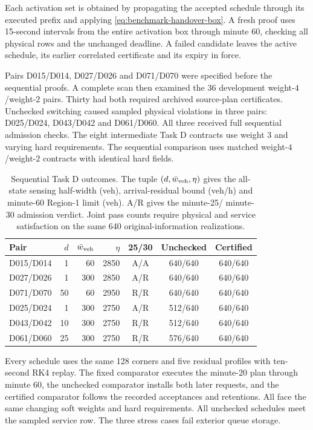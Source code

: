 \documentclass[preprint,12pt]{elsarticle}
\begin{document}
Each activation set is obtained by propagating the accepted schedule
through its executed prefix and applying
\eqref{eq:benchmark-handover-box}. A fresh proof uses 15-second intervals
from the entire activation box through minute 60, checking all physical
rows and the unchanged deadline. A failed candidate leaves the active
schedule, its earlier correlated certificate and its expiry in force.

Pairs D015/D014, D027/D026 and D071/D070 were specified before the
sequential proofs. A complete scan then examined the 36 development
weight-$4$/weight-$2$ pairs. Thirty had both required archived source-plan
certificates. Unchecked switching caused sampled physical violations in
three pairs: D025/D024, D043/D042 and D061/D060. All three received full
sequential admission checks. The eight intermediate Task D contracts
use weight $3$ and varying hard requirements. The sequential comparison
uses matched weight-$4$/weight-$2$ contracts with identical hard fields.

\begin{table}[t]
\centering\small
\caption{Sequential Task D outcomes. The tuple $(d,\bar w_{\rm veh},\eta)$
gives the all-state sensing half-width (veh), arrival-residual bound
(veh/h) and minute-60 Region-1 limit (veh). A/R gives the minute-25/
minute-30 admission verdict. Joint pass counts require physical and
service satisfaction on the same 640 original-information realizations.}
\label{tab:supp-sequential-coverage}
\setlength{\tabcolsep}{4pt}
\begin{tabular}{@{}lrrrccc@{}}
\toprule
Pair & $d$ & $\bar w_{\rm veh}$ & $\eta$ & 25/30 & Unchecked & Certified\\
\midrule
D015/D014 & 1 & 60 & 2850 & A/A & 640/640 & 640/640\\
D027/D026 & 1 & 300 & 2850 & A/R & 640/640 & 640/640\\
D071/D070 & 50 & 60 & 2950 & R/R & 640/640 & 640/640\\
D025/D024 & 1 & 300 & 2750 & A/R & 512/640 & 640/640\\
D043/D042 & 10 & 300 & 2750 & R/R & 512/640 & 640/640\\
D061/D060 & 25 & 300 & 2750 & R/R & 576/640 & 640/640\\
\bottomrule
\end{tabular}
\end{table}

Every schedule uses the same 128 corners and five residual profiles with
ten-second RK4 replay. The fixed comparator executes the minute-20 plan
through minute 60, the unchecked comparator installs both later requests,
and the certified comparator follows the recorded acceptances and
retentions. All face the same changing soft weights and hard requirements.
All unchecked schedules meet the sampled service row. The three stress
cases fail exterior queue storage.
\end{document}
